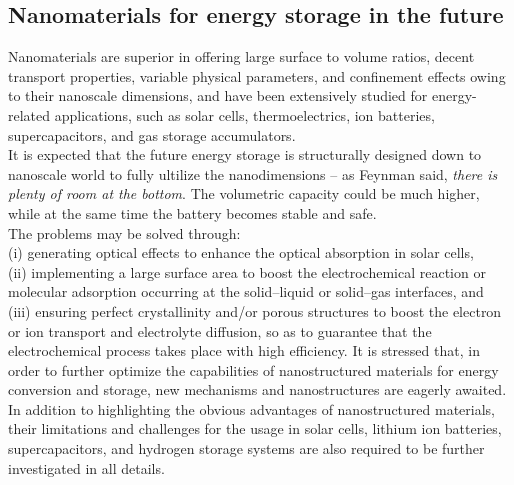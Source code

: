 \subsection{Nanomaterials for energy storage in the future}
Nanomaterials are superior in offering large surface to volume ratios, decent transport properties, variable physical parameters, and confinement effects owing to their nanoscale dimensions, and have been extensively studied for energy-related applications, such as solar cells, thermoelectrics, ion batteries, supercapacitors, and gas storage accumulators.\\
It is expected that the future energy storage is structurally designed down to nanoscale world to fully ultilize the nanodimensions -- as Feynman said, \textit{there is plenty of room at the bottom}. The volumetric capacity could be much higher, while at the same time the battery becomes stable and safe. \\
The problems may be solved through:\\
(i) generating optical effects to enhance the optical absorption in solar cells, \\
(ii) implementing a large surface area to boost the electrochemical reaction or molecular adsorption occurring at the solid–liquid or solid–gas interfaces, and\\
(iii) ensuring perfect crystallinity and/or porous structures to boost the electron or ion transport and electrolyte diffusion, so as to guarantee that the electrochemical process takes place with high efficiency. It is stressed that, in order to further optimize the capabilities of nanostructured materials for energy conversion and storage, new mechanisms and nanostructures are eagerly awaited. \\
In addition to highlighting the obvious advantages of nanostructured materials, their limitations and challenges for the usage in solar cells, lithium ion batteries, supercapacitors, and hydrogen storage systems are also required to be further investigated in all details.\cite{qifengzhang2013csr}\\


